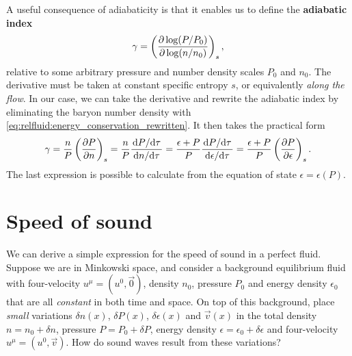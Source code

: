 A useful consequence of adiabaticity is that it enables us to define the \textbf{adiabatic index}
\begin{equation}
	\gamma = \left( \pdv{\log (P/P_0)}{\log (n/n_0)} \right)_s ,
\end{equation}
relative to some arbitrary pressure and number density scales $P_0$ and $n_0$.
The derivative must be taken at constant specific entropy $s$, or equivalently \emph{along the flow}.
In our case, we can take the derivative and rewrite the adiabatic index by eliminating the baryon number density with \cref{eq:relfluid:energy_conservation_rewritten}.
It then takes the practical form
\begin{equation}
	\gamma = \frac{n}{P} \left( \pdv{P}{n} \right)_s
	       = \frac{n}{P} \frac{\odv{P}/{\tau}}{\odv{n}/{\tau}}
	       = \frac{\epsilon+P}{P} \frac{\odv{P}/{\tau}}{\odv{\epsilon}/{\tau}}
	       = \frac{\epsilon+P}{P} \left( \pdv{P}{\epsilon} \right)_s .
\label{eq:relfluid:adiabadicity}
\end{equation}
The last expression is possible to calculate from the equation of state $\epsilon = \epsilon(P)$.

\section{Speed of sound}
\label{sec:relfluid:sound}

We can derive a simple expression for the speed of sound in a perfect fluid.
Suppose we are in Minkowski space, and consider a background equilibrium fluid with four-velocity $u^\mu = (u^0, \vec{0})$, density $n_0$, pressure $P_0$ and energy density $\epsilon_0$ that are all \emph{constant} in both time and space.
On top of this background, place \emph{small} variations $\delta n(x)$, $\delta P(x)$, $\delta \epsilon(x)$ and $\vec{v}(x)$ in the total density $n = n_0 + \delta n$, pressure $P = P_0 + \delta P$, energy density $\epsilon = \epsilon_0 + \delta \epsilon$ and four-velocity $u^\mu = (u^0, \vec{v})$.
How do sound waves result from these variations?

